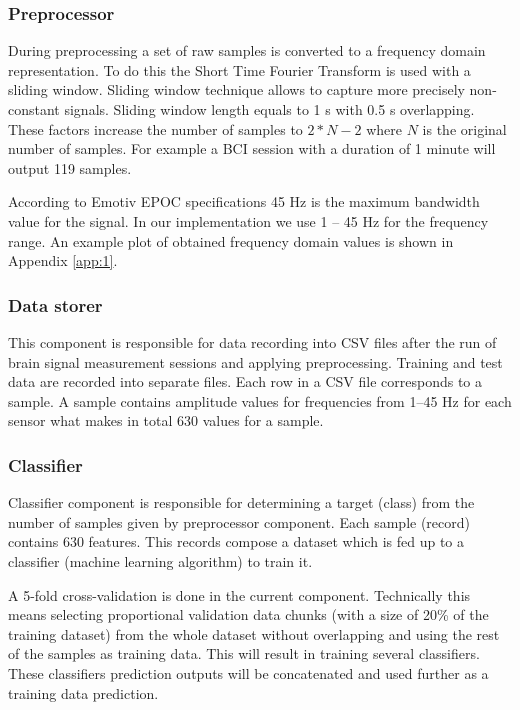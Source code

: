 \documentclass[12pt]{article}
\theoremstyle{definition}
\begin{document}
\subsubsection{Preprocessor}

During preprocessing a set of raw samples is converted to a frequency domain representation. To do this the Short Time Fourier Transform is used with a sliding window. Sliding window technique allows to capture more precisely non-constant signals. Sliding window length equals to 1 s with 0.5 s overlapping. These factors increase the number of samples to $2*N-2$ where $N$ is the original number of samples. For example a BCI session with a duration of 1 minute will output 119 samples.

According to Emotiv EPOC specifications \cite{emotiv} 45 Hz is the maximum bandwidth value for the signal. In our implementation we use 1 -- 45 Hz for the frequency range. An example plot of obtained frequency domain values is shown in Appendix \ref{app:1}.

\subsubsection{Data storer}

This component is responsible for data recording into CSV files after the run of brain signal measurement sessions and applying preprocessing. Training and test data are recorded into separate files. Each row in a CSV file corresponds to a sample. A sample contains amplitude values for frequencies from 1--45 Hz for each sensor what makes in total 630 values for a sample. 

\subsubsection{Classifier}

Classifier component is responsible for determining a target (class) from the number of samples given by preprocessor component. Each sample (record) contains 630 features. This records compose a dataset which is fed up to a classifier (machine learning algorithm) to train it. 

A 5-fold cross-validation is done in the current component. Technically this means selecting proportional validation data chunks (with a size of 20\% of the training dataset) from the whole dataset without overlapping and using the rest of the samples as training data. This will result in training several classifiers. These classifiers prediction outputs will be concatenated and used further as a training data prediction.
\end{document}
